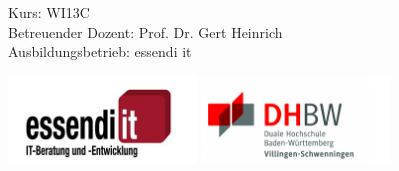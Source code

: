 \begin{titlepage}

\maketitle
\thispagestyle{empty}

\begin{centering}
Kurs: WI13C\\
Betreuender Dozent: Prof. Dr. Gert Heinrich\\
Ausbildungsbetrieb: essendi it \\
\end{centering}
\vspace{13cm}


\includegraphics[width=5cm]{images/essendi-logo.png}
\hfill
\includegraphics[width=5cm]{images/dhbw-logo.png}

\vfill

\end{titlepage}